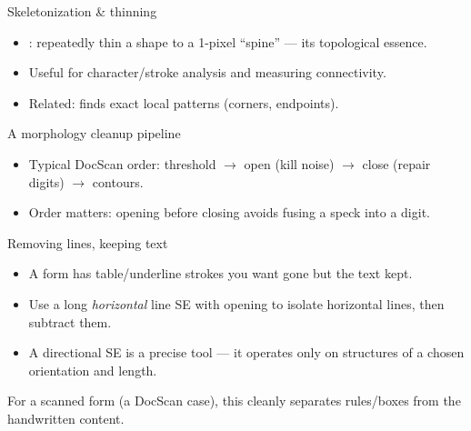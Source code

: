 \documentclass[10pt,aspectratio=169]{beamer}
\begin{document}
\begin{frame}{Skeletonization \& thinning}
  \begin{itemize}
    \item {}: repeatedly thin a shape to a 1-pixel ``spine'' — its topological essence.
    \item Useful for character/stroke analysis and measuring connectivity.
    \item Related:  finds exact local patterns (corners, endpoints).
  \end{itemize}
\end{frame}

\begin{frame}{A morphology cleanup pipeline}
  \begin{center}
  \end{center}
  \begin{itemize}
    \item Typical DocScan order: threshold $\rightarrow$ open (kill noise) $\rightarrow$ close (repair digits) $\rightarrow$ contours.
    \item Order matters: opening before closing avoids fusing a speck into a digit.
  \end{itemize}
\end{frame}

\begin{frame}{Removing lines, keeping text}
  \begin{itemize}
    \item A form has table/underline strokes you want gone but the text kept.
    \item Use a long \emph{horizontal} line SE with opening to isolate horizontal lines, then subtract them.
    \item A directional SE is a precise tool — it operates only on structures of a chosen orientation and length.
  \end{itemize}
  \begin{goodbox}
    For a scanned form (a DocScan case), this cleanly separates rules/boxes from the handwritten content.
  \end{goodbox}
\end{frame}
\end{document}
